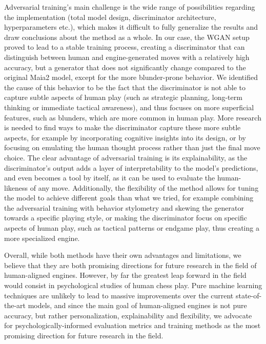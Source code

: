 Adversarial training's main challenge is the wide range of possibilities regarding the implementation (total model design, discriminator architecture, hyperparameters etc.), which makes it difficult to fully generalize the results and draw conclusions about the method as a whole.
In our case, the WGAN setup proved to lead to a stable training process, creating a discriminator that can distinguish between human and engine-generated moves with a relatively high accuracy, but a generator that does not significantly change compared to the original Maia2 model, except for the more blunder-prone behavior.
We identified the cause of this behavior to be the fact that the discriminator is not able to capture subtle aspects of human play (such as strategic planning, long-term thinking or immediate tactical awareness), and thus focuses on more superficial features, such as blunders, which are more common in human play.
More research is needed to find ways to make the discriminator capture these more subtle aspects, for example by incorporating cognitive insights into its design, or by focusing on emulating the human thought process rather than just the final move choice.
The clear advantage of adversarial training is its explainability, as the discriminator's output adds a layer of interpretability to the model's predictions, and even becomes a tool by itself, as it can be used to evaluate the human-likeness of any move.
Additionally, the flexibility of the method allows for tuning the model to achieve different goals than what we tried, for example combining the adversarial training with behavior stylometry and skewing the generator towards a specific playing style, or making the discriminator focus on specific aspects of human play, such as tactical patterns or endgame play, thus creating a more specialized engine.

Overall, while both methods have their own advantages and limitations, we believe that they are both promising directions for future research in the field of human-aligned engines.
However, by far the greatest leap forward in the field would consist in psychological studies of human chess play.
Pure machine learning techniques are unlikely to lead to massive improvements over the current state-of-the-art models, and since the main goal of human-aligned engines is not pure accuracy, but rather personalization, explainability and flexibility, we advocate for psychologically-informed evaluation metrics and training methods as the most promising direction for future research in the field.